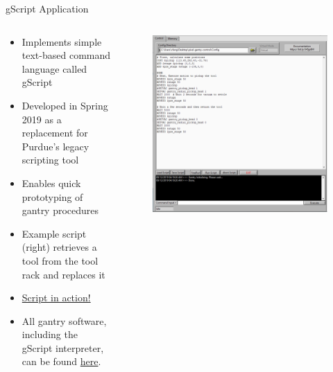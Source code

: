 \documentclass[english,aspectratio=43,8pt]{beamer}
\begin{document}
\begin{frame}{gScript Application}
  \begin{columns}
    \begin{column}{0.35\textwidth}
      \begin{itemize}
          \item Implements simple text-based command language called gScript
          \item Developed in Spring 2019 as a replacement for Purdue's legacy scripting tool
          \item Enables quick prototyping of gantry procedures
          \item Example script (right) retrieves a tool from the tool rack and replaces it
          \item \href{https://youtu.be/5qrpeWGLro0}{Script in action!}
          \item All gantry software, including the gScript interpreter, can be found \href{https://github.com/CUASAS/pixel-gantry-control}{here}.
      \end{itemize}
    \end{column}
    \begin{column}{0.65\textwidth}
    \begin{figure}
        \includegraphics[width=\textwidth]{figures/gScript_UI.PNG}
    \end{figure}
  \end{column}
  \end{columns}
\end{frame}
\end{document}
